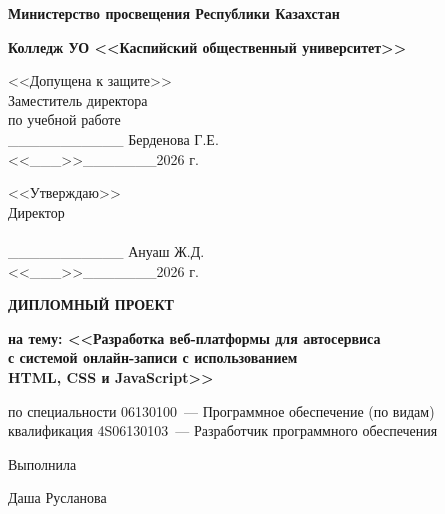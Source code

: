\documentclass[14pt,a4paper,oneside]{extarticle}
\begin{document}
\begin{titlepage}
\thispagestyle{empty}
\begin{center}

\textbf{Министерство просвещения Республики Казахстан}

\vspace{4pt}
\textbf{Колледж УО <<Каспийский общественный университет>>}

\vspace{30pt}

\begin{minipage}[t]{0.48\textwidth}
\raggedright
<<Допущена к защите>>\\
Заместитель директора\\
по учебной работе\\
\_\_\_\_\_\_\_\_\_\_\_ Берденова Г.Е.\\
<<\_\_\_>>\_\_\_\_\_\_\_2026 г.
\end{minipage}
\hfill
\begin{minipage}[t]{0.42\textwidth}
\raggedleft
<<Утверждаю>>\\
Директор\\
~\\
\_\_\_\_\_\_\_\_\_\_\_ Ануаш Ж.Д.\\
<<\_\_\_>>\_\_\_\_\_\_\_2026 г.
\end{minipage}

\vspace{50pt}

{\fontsize{22}{26}\selectfont\bfseries ДИПЛОМНЫЙ ПРОЕКТ}

\vspace{16pt}

{\fontsize{16}{19}\selectfont\bfseries на тему: <<Разработка веб-платформы для автосервиса\\ с системой онлайн-записи с использованием\\ HTML, CSS и JavaScript>>}

\vspace{12pt}

по специальности 06130100~--- Программное обеспечение (по видам)\\
квалификация 4S06130103~--- Разработчик программного обеспечения

\vspace{50pt}

\begin{minipage}[t]{0.48\textwidth}
\raggedright
Выполнила
\end{minipage}
\hfill
\begin{minipage}[t]{0.42\textwidth}
\raggedleft
Даша Русланова
\end{minipage}


\end{center}
\end{titlepage}
\end{document}
